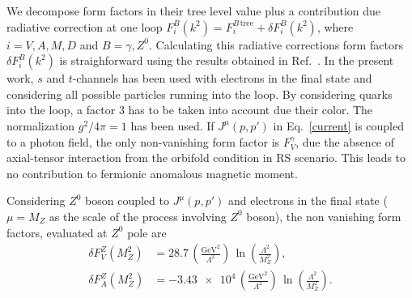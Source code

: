 \documentclass[twocolumn,showpacs,showkeys,prd,superscriptaddress]{revtex4-1}
\begin{document}
%  
We decompose form factors in their tree level value plus a contribution due radiative correction at one loop $F_i^B(k^2) = F_i^{B\,\text{tree}} + \delta F_i^B(k^2)$, where $i=V,A,M,D$ and $B = \gamma,Z^0$. Calculating this radiative corrections form factors $\delta F_i^B(k^2)$ is straighforward using the results obtained in Ref.~\cite{GonzalezGarcia:1998ay}. In the present work, $s$ and $t$-channels has been used with electrons in the final state and considering all possible particles running into the loop. By considering quarks into the loop, a factor $3$ has to be taken into account due their color. The normalization $g^2/4\pi = 1$ has been used. If $J^\mu(p,p')$ in Eq.~\eqref{current} is coupled to a photon field, the only non-vanishing form factor is $F_V^\gamma$, due the absence of axial-tensor interaction from the orbifold condition in RS scenario. This leads to no contribution to fermionic anomalous magnetic moment.

Considering $Z^0$ boson coupled to $J^\mu(p,p')$ and electrons in the final state ($\mu = M_Z$ as the scale of the process involving $Z^0$ boson), the non vanishing form factors, evaluated at $Z^0$ pole are  
\begin{align}
  \delta F_V^Z(M_Z^2) &= \num{28.7} \, \left(\frac{\si{\GeV}^2}{\Lambda^2}\right)\,\ln\left(\frac{\Lambda^2}{M_Z^2}\right), \\
  \delta F_A^Z(M_Z^2) &= -\num{3.43e4} \, \left(\frac{\si{\GeV}^2}{\Lambda^2}\right)\,\ln\left(\frac{\Lambda^2}{M_Z^2}\right).
\end{align}
\end{document}
